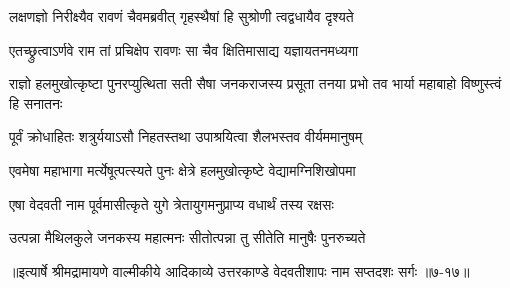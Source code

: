 \twolineshloka
{लक्षणज्ञो निरीक्ष्यैव रावणं चैवमब्रवीत्}
{गृहस्थैषां हि सुश्रोणी त्वद्वधायैव दृश्यते} %

\twolineshloka
{एतच्छ्रुत्वाऽर्णवे राम तां प्रचिक्षेप रावणः}
{सा चैव क्षितिमासाद्य यज्ञायतनमध्यगा} %

\threelineshloka
{राज्ञो हलमुखोत्कृष्टा पुनरप्युत्थिता सती}
{सैषा जनकराजस्य प्रसूता तनया प्रभो}
{तव भार्या महाबाहो विष्णुस्त्वं हि सनातनः} %

\twolineshloka
{पूर्वं क्रोधाहितः शत्रुर्ययाऽसौ निहतस्तथा}
{उपाश्रयित्वा शैलभस्तव वीर्यममानुषम्} %

\twolineshloka
{एवमेषा महाभागा मर्त्येषूत्पत्स्यते पुनः}
{क्षेत्रे हलमुखोत्कृष्टे वेद्यामग्निशिखोपमा} %

\twolineshloka
{एषा वेदवती नाम पूर्वमासीत्कृते युगे}
{त्रेतायुगमनुप्राप्य वधार्थं तस्य रक्षसः} %

\twolineshloka
{उत्पन्ना मैथिलकुले जनकस्य महात्मनः}
{सीतोत्पन्ना तु सीतेति मानुषैः पुनरुच्यते} %


॥इत्यार्षे श्रीमद्रामायणे वाल्मीकीये आदिकाव्ये उत्तरकाण्डे वेदवतीशापः नाम सप्तदशः सर्गः ॥७-१७॥

